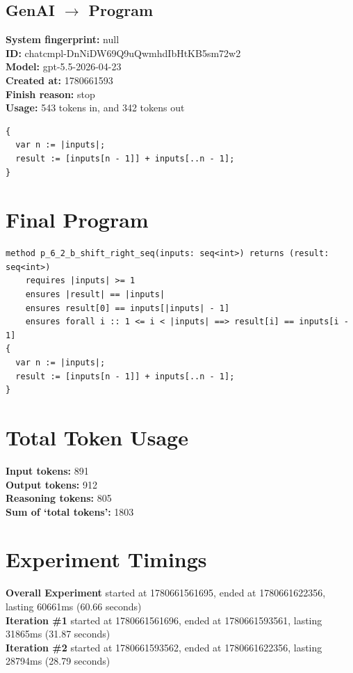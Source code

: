 \documentclass{article}
\begin{document}
\subsection*{GenAI $\rightarrow$ Program}
\textbf{System fingerprint: }null
\\\textbf{ID: }chatcmpl-DnNiDW69Q9uQwmhdIbHtKB5sm72w2
\\\textbf{Model: }gpt-5.5-2026-04-23
\\\textbf{Created at: }1780661593
\\\textbf{Finish reason: }stop
\\\textbf{Usage: }543 tokens in, and 342 tokens out
\begin{lstlisting}
{
  var n := |inputs|;
  result := [inputs[n - 1]] + inputs[..n - 1];
}
\end{lstlisting}
\section*{Final Program}
\begin{lstlisting}
method p_6_2_b_shift_right_seq(inputs: seq<int>) returns (result: seq<int>)
	requires |inputs| >= 1
	ensures |result| == |inputs|
	ensures result[0] == inputs[|inputs| - 1]
	ensures forall i :: 1 <= i < |inputs| ==> result[i] == inputs[i - 1]
{
  var n := |inputs|;
  result := [inputs[n - 1]] + inputs[..n - 1];
}
\end{lstlisting}
\section*{Total Token Usage}
\textbf{Input tokens: }891
\\\textbf{Output tokens: }912
\\\textbf{Reasoning tokens: }805
\\\textbf{Sum of `total tokens': }1803
\section*{Experiment Timings}
\textbf{Overall Experiment} started at 1780661561695, ended at 1780661622356, lasting 60661ms (60.66 seconds)
\\\textbf{Iteration \#1} started at 1780661561696, ended at 1780661593561, lasting 31865ms (31.87 seconds)
\\\textbf{Iteration \#2} started at 1780661593562, ended at 1780661622356, lasting 28794ms (28.79 seconds)
\end{document}
